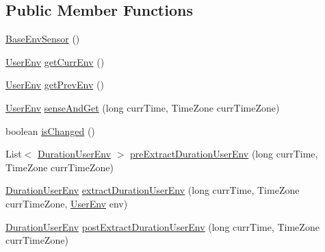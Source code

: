 \subsection*{\-Public \-Member \-Functions}
\begin{DoxyCompactItemize}
\item 
\hyperlink{classlab_1_1davidahn_1_1appshuttle_1_1collect_1_1env_1_1_base_env_sensor_a2cca6f10a6b17b4fa12f04cb7152b480}{\-Base\-Env\-Sensor} ()
\item 
\hyperlink{classlab_1_1davidahn_1_1appshuttle_1_1collect_1_1env_1_1_user_env}{\-User\-Env} \hyperlink{classlab_1_1davidahn_1_1appshuttle_1_1collect_1_1env_1_1_base_env_sensor_a8f60be11546f38684ddf9436a691ca3f}{get\-Curr\-Env} ()
\item 
\hyperlink{classlab_1_1davidahn_1_1appshuttle_1_1collect_1_1env_1_1_user_env}{\-User\-Env} \hyperlink{classlab_1_1davidahn_1_1appshuttle_1_1collect_1_1env_1_1_base_env_sensor_a7004f40c10ac9fcaf0782d9870c92b5b}{get\-Prev\-Env} ()
\item 
\hyperlink{classlab_1_1davidahn_1_1appshuttle_1_1collect_1_1env_1_1_user_env}{\-User\-Env} \hyperlink{classlab_1_1davidahn_1_1appshuttle_1_1collect_1_1env_1_1_base_env_sensor_ae44a25a62194a5957103ba8c5965f6d3}{sense\-And\-Get} (long curr\-Time, \-Time\-Zone curr\-Time\-Zone)
\item 
boolean \hyperlink{classlab_1_1davidahn_1_1appshuttle_1_1collect_1_1env_1_1_base_env_sensor_aa5992b75385c4e5d09d96bb3a0bd0c4c}{is\-Changed} ()
\item 
\-List$<$ \hyperlink{classlab_1_1davidahn_1_1appshuttle_1_1collect_1_1env_1_1_duration_user_env}{\-Duration\-User\-Env} $>$ \hyperlink{classlab_1_1davidahn_1_1appshuttle_1_1collect_1_1env_1_1_base_env_sensor_ade784ddb0c5905e20ce4ebead9bfe8c6}{pre\-Extract\-Duration\-User\-Env} (long curr\-Time, \-Time\-Zone curr\-Time\-Zone)
\item 
\hyperlink{classlab_1_1davidahn_1_1appshuttle_1_1collect_1_1env_1_1_duration_user_env}{\-Duration\-User\-Env} \hyperlink{classlab_1_1davidahn_1_1appshuttle_1_1collect_1_1env_1_1_base_env_sensor_ab18b816952c26259a2d19b0845d1254c}{extract\-Duration\-User\-Env} (long curr\-Time, \-Time\-Zone curr\-Time\-Zone, \hyperlink{classlab_1_1davidahn_1_1appshuttle_1_1collect_1_1env_1_1_user_env}{\-User\-Env} env)
\item 
\hyperlink{classlab_1_1davidahn_1_1appshuttle_1_1collect_1_1env_1_1_duration_user_env}{\-Duration\-User\-Env} \hyperlink{classlab_1_1davidahn_1_1appshuttle_1_1collect_1_1env_1_1_base_env_sensor_abc2eaabb25838e487ff6e2a8bfb0d80d}{post\-Extract\-Duration\-User\-Env} (long curr\-Time, \-Time\-Zone curr\-Time\-Zone)
\end{DoxyCompactItemize}
